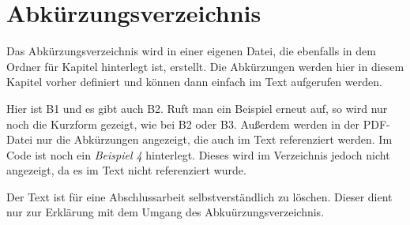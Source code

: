 \chapter{Abkürzungsverzeichnis}
Das Abkürzungsverzeichnis wird in einer eigenen Datei, die ebenfalls in dem Ordner für Kapitel hinterlegt ist, erstellt. Die Abkürzungen werden hier in diesem Kapitel vorher definiert und können dann einfach im Text aufgerufen werden.

Hier ist \ac{B1} und es gibt auch \ac{B2}. Ruft man ein Beispiel erneut auf, so wird nur noch die Kurzform gezeigt, wie bei \ac{B2} oder \ac{B3}. Außerdem werden in der PDF-Datei nur die Abkürzungen angezeigt, die auch im Text referenziert werden. Im Code ist noch ein \emph{Beispiel 4} hinterlegt. Dieses wird im Verzeichnis jedoch nicht angezeigt, da es im Text nicht referenziert wurde.

Der Text ist für eine Abschlussarbeit selbstverständlich zu löschen. Dieser dient nur zur Erklärung mit dem Umgang des Abkuürzungsverzeichnis.

\begin{acronym}[slmtA]
\end{acronym}